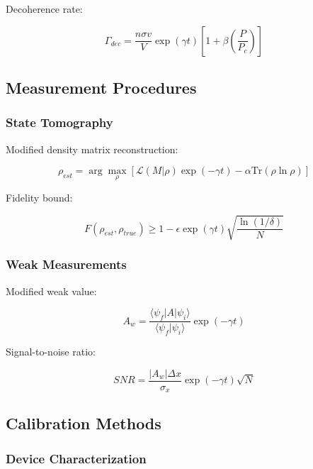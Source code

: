 \documentclass[12pt]{article}
\theoremstyle{plain}
\theoremstyle{definition}
\theoremstyle{remark}
\begin{document}
Decoherence rate:

\begin{equation}
\Gamma_{dec} = \frac{n\sigma v}{V}\exp(\gamma t)\left[1 + \beta\left(\frac{P}{P_c}\right)\right]
\end{equation}

\subsection{Measurement Procedures}

\subsubsection{State Tomography}

Modified density matrix reconstruction:

\begin{equation}
\rho_{est} = \arg\max_\rho \left[\mathcal{L}(M|\rho)\exp(-\gamma t) - \alpha\text{Tr}(\rho\ln\rho)\right]
\end{equation}

Fidelity bound:

\begin{equation}
F(\rho_{est},\rho_{true}) \geq 1 - \epsilon\exp(\gamma t)\sqrt{\frac{\ln(1/\delta)}{N}}
\end{equation}

\subsubsection{Weak Measurements}

Modified weak value:

\begin{equation}
A_w = \frac{\langle\psi_f|A|\psi_i\rangle}{\langle\psi_f|\psi_i\rangle}\exp(-\gamma t)
\end{equation}

Signal-to-noise ratio:

\begin{equation}
SNR = \frac{|A_w|\Delta x}{\sigma_x}\exp(-\gamma t)\sqrt{N}
\end{equation}

\subsection{Calibration Methods}

\subsubsection{Device Characterization}
\end{document}
